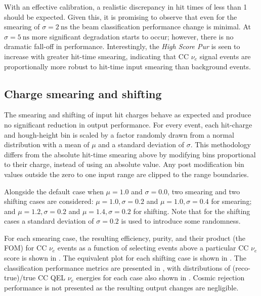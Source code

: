 With an effective calibration, a realistic discrepancy in hit times of less than \SI{1}{}
should be expected. Given this, it is promising to observe that even for the smearing of
$\sigma=2~\text{ns}$ the beam classification performance change is minimal. At
$\sigma=5~\text{ns}$ more significant degradation starts to occur; however, there is no dramatic
fall-off in performance. Interestingly, the \emph{High Score Pur} is seen to increase with greater
hit-time smearing, indicating that CC $\nu_{e}$ signal events are proportionally more robust to
hit-time input smearing than background events.

\subsection{Charge smearing and shifting} %
\label{sec:results_robust_charge} %

The smearing and shifting of input hit charges behave as expected and produce no significant
reduction in output performance. For every event, each hit-charge and hough-height bin is scaled
by a factor randomly drawn from a normal distribution with a mean of $\mu$ and a standard
deviation of $\sigma$. This methodology differs from the absolute hit-time smearing above by
modifying bins proportional to their charge, instead of using an absolute value. Any post
modification bin values outside the zero to one input range are clipped to the range boundaries.

Alongside the default case when $\mu=1.0$ and $\sigma=0.0$, two smearing and two shifting cases
are considered: $\mu=1.0,\sigma=0.2$ and $\mu=1.0,\sigma=0.4$ for smearing; and
$\mu=1.2,\sigma=0.2$ and $\mu=1.4,\sigma=0.2$ for shifting. Note that for the shifting cases a
standard deviation of $\sigma=0.2$ is used to introduce some randomness.

For each smearing case, the resulting efficiency, purity, and their product (the FOM) for CC
$\nu_{e}$ events as a function of selecting events above a particular CC $\nu_{e}$ score is shown
in . The equivalent plot for each shifting case
is shown in . The classification performance
metrics are presented in , with distributions of (reco-true)/true CC
QEL $\nu_{e}$ energies for each case also shown in . Cosmic
rejection performance is not presented as the resulting output changes are negligible.

